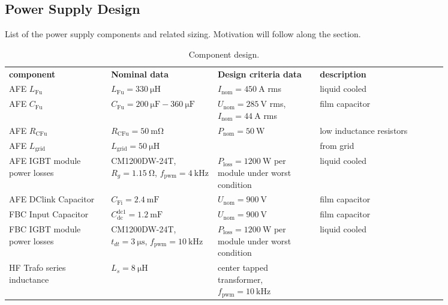 \documentclass[11pt,a4paper]{scrartcl}
\begin{document}
\begin{onehalfspace}
\section{Power Supply Design}\label{sec:topology}

List of the power supply components and related sizing. Motivation will follow along the section.
 \begin{center}	
	\onehalfspacing
	\begin{longtable}{p{0.2\linewidth}|p{0.2\linewidth}|p{0.2\linewidth}|p{0.25\linewidth}}
		\captionsetup{width=0.65\textwidth, font=small}
		\caption{Component design.}
		\label{table:design} \\
		\toprule
		\textbf{component} & \textbf{Nominal data}  & \textbf{Design criteria data}  & \textbf{description} \\
		\midrule
		AFE $L_\text{Fu}$ & $L_\text{Fu} = \SI{330}{\micro\henry}$ & $I_\text{nom} = \SI{450}{\ampere}$ rms & liquid cooled \\	
		\midrule	
		AFE $C_\text{Fu}$ & $C_\text{Fu} = \SI{200}{\micro\farad}-\SI{360}{\micro\farad}$ & $U_\text{nom} = \SI{285}{\volt}$ rms, $I_\text{nom} = \SI{44}{\ampere}$ rms & film capacitor \\		
		\midrule
		AFE $R_\text{CFu}$ & $R_\text{CFu} = \SI{50}{\milli\ohm}$ & $P_\text{nom} = \SI{50}{\watt}$ & low inductance resistors \\
		\midrule
		AFE $L_\text{grid}$ & $L_\text{grid} = \SI{50}{\micro\henry}$ &  & from grid \\
		\midrule
		AFE IGBT module power losses & CM1200DW-24T, $R_g = \SI{1.15}{\ohm}$, $f_\text{pwm} = \SI{4}{\kilo\hertz}$ & $P_\text{loss} = \SI{1200}{\watt}$ per module under worst condition  & liquid cooled \\
		\midrule
		AFE DClink Capacitor & $C_\text{Fi} = \SI{2.4}{\milli\farad}$ & $U_\text{nom} = \SI{900}{\volt}$  & film capacitor \\
		\midrule
		FBC Input Capacitor & $C_\text{dc}^\text{dc1} = \SI{1.2}{\milli\farad}$ & $U_\text{nom} = \SI{900}{\volt}$  & film capacitor \\
		\midrule
		FBC IGBT module power losses & CM1200DW-24T, $t_{dt} = \SI{3}{\micro\second}$, $f_\text{pwm} = \SI{10}{\kilo\hertz}$ & $P_\text{loss} = \SI{1200}{\watt}$ per module under worst condition & liquid cooled \\
		\midrule
		HF Trafo series inductance & $L_s = \SI{8}{\micro\henry}$ & center tapped transformer, $f_\text{pwm} = \SI{10}{\kilo\hertz}$ & \\

\end{longtable}
\end{center}
\end{onehalfspace}
\end{document}
